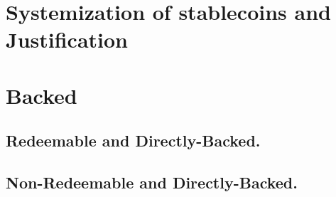 
\section{Systemization of stablecoins and Justification}






\section{Backed}

\subsection{Redeemable and Directly-Backed.}


\subsection{Non-Redeemable and Directly-Backed.}
% 

